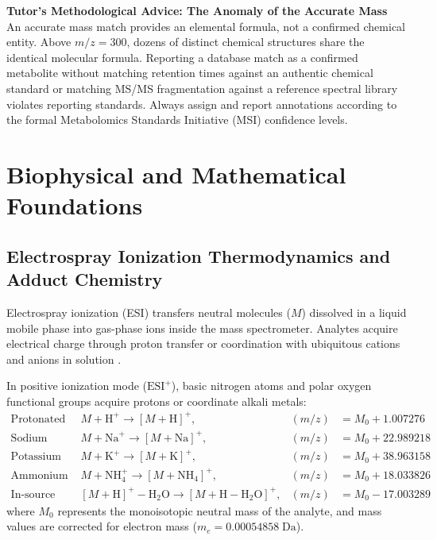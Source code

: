 \documentclass[11pt,twoside,openright]{book}
\begin{document}
\FloatBarrier

\begin{notebox}
\textbf{Tutor's Methodological Advice: The Anomaly of the Accurate Mass}\\
An accurate mass match provides an elemental formula, not a confirmed chemical entity. Above $m/z = 300$, dozens of distinct chemical structures share the identical molecular formula. Reporting a database match as a confirmed metabolite without matching retention times against an authentic chemical standard or matching MS/MS fragmentation against a reference spectral library violates reporting standards. Always assign and report annotations according to the formal Metabolomics Standards Initiative (MSI) confidence levels.
\end{notebox}

\section{Biophysical and Mathematical Foundations}

\subsection{Electrospray Ionization Thermodynamics and Adduct Chemistry}

Electrospray ionization (ESI) transfers neutral molecules ($M$) dissolved in a liquid mobile phase into gas-phase ions inside the mass spectrometer. Analytes acquire electrical charge through proton transfer or coordination with ubiquitous cations and anions in solution \cite{gross2017mass}.

In positive ionization mode ($\text{ESI}^+$), basic nitrogen atoms and polar oxygen functional groups acquire protons or coordinate alkali metals:
\begin{align}
\text{Protonated molecule: } & M + \text{H}^+ \xrightarrow{} [M+\text{H}]^+, & (m/z) &= M_0 + 1.007276 \\
\text{Sodium adduct: } & M + \text{Na}^+ \xrightarrow{} [M+\text{Na}]^+, & (m/z) &= M_0 + 22.989218 \\
\text{Potassium adduct: } & M + \text{K}^+ \xrightarrow{} [M+\text{K}]^+, & (m/z) &= M_0 + 38.963158 \\
\text{Ammonium adduct: } & M + \text{NH}_4^+ \xrightarrow{} [M+\text{NH}_4]^+, & (m/z) &= M_0 + 18.033826 \\
\text{In-source water loss: } & [M+\text{H}]^+ - \text{H}_2\text{O} \xrightarrow{} [M+\text{H}-\text{H}_2\text{O}]^+, & (m/z) &= M_0 - 17.003289
\end{align}
where $M_0$ represents the monoisotopic neutral mass of the analyte, and mass values are corrected for electron mass ($m_e = 0.00054858\;\text{Da}$).
\end{document}
